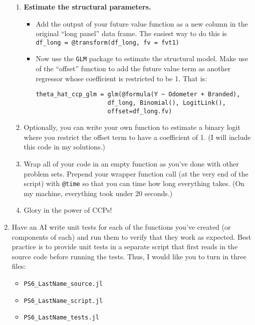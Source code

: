 \documentclass[12pt,english]{article}
\begin{document}
\begin{enumerate}
\begin{enumerate}
        \item \textbf{Estimate the structural parameters.}
        \begin{itemize}
            \item Add the output of your future value function as a new column in the original ``long panel'' data frame. The easiest way to do this is \texttt{df\_long = @transform(df\_long, fv = fvt1)}
            \item Now use the \texttt{GLM} package to estimate the structural model. Make use of the ``offset'' function to add the future value term as another regressor whose coefficient is restricted to be 1. That is:
            \begin{verbatim}
theta_hat_ccp_glm = glm(@formula(Y ~ Odometer + Branded), 
                    df_long, Binomial(), LogitLink(), 
                    offset=df_long.fv)
                \end{verbatim}
        \end{itemize}
        \item Optionally, you can write your own function to estimate a binary logit where you restrict the offset term to have a coefficient of 1. (I will include this code in my solutions.)
    \item Wrap all of your code in an empty function as you've done with other problem sets. Prepend your wrapper function call (at the very end of the script) with \texttt{@time} so that you can time how long everything takes. (On my machine, everything took under 20 seconds.)
    \item Glory in the power of CCPs!
    \end{enumerate}



\item Have an AI write unit tests for each of the functions you've created (or components of each) and run them to verify that they work as expected. Best practice is to provide unit tests in a separate script that first reads in the source code before running the tests. Thus, I would like you to turn in three files:
    \begin{itemize}
        \item \texttt{PS6\_LastName\_source.jl}
        \item \texttt{PS6\_LastName\_script.jl}
        \item \texttt{PS6\_LastName\_tests.jl}
    \end{itemize}


\end{enumerate}
\end{document}
